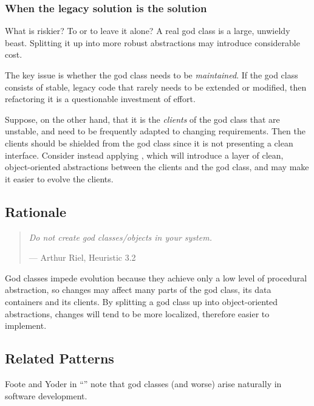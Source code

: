 \documentclass[a4paper,10pt,twoside]{book}
\begin{document}
\subsubsection*{When the legacy solution is the solution}

What is riskier? To  or to leave it alone? A real god class is a large, unwieldy beast. Splitting it up into more robust abstractions may introduce considerable cost.

The key issue is whether the god class needs to be \emph{maintained}. If the god class consists of stable, legacy code that rarely needs to be extended or modified, then refactoring it is a questionable investment of effort.

Suppose, on the other hand, that it is the \emph{clients} of the god class that are unstable, and need to be frequently adapted to changing requirements. Then the clients should be shielded from the god class since it is not presenting a clean interface. Consider instead applying , which will introduce a layer of clean, object-oriented abstractions between the clients and the god class, and may make it easier to evolve the clients.

\subsection*{Rationale}

\begin{quotation}
\emph{Do not create god classes/objects in your system.}

\hfill --- Arthur Riel, Heuristic 3.2 \cite{Riel96a}
\end{quotation}

God classes impede evolution because they achieve only a low level of procedural abstraction, so changes may affect many parts of the god class, its data containers and its clients. By splitting a god class up into object-oriented abstractions, changes will tend to be more localized, therefore easier to implement.

\subsection*{Related Patterns}

Foote and Yoder in ``'' \cite{Foot00a} note that god classes (and worse) arise naturally in software development. 
\end{document}
